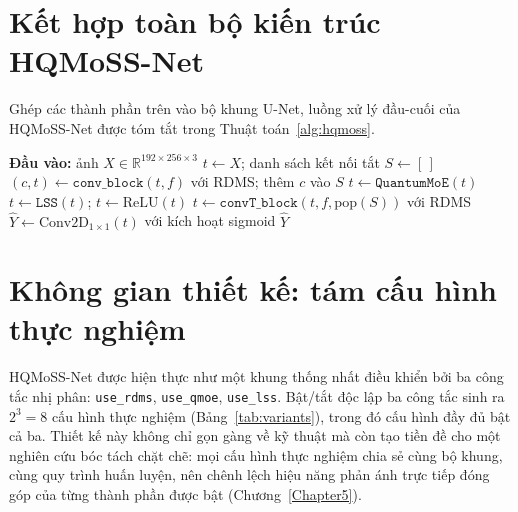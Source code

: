 \section{Kết hợp toàn bộ kiến trúc HQMoSS-Net}
Ghép các thành phần trên vào bộ khung U-Net, luồng xử lý đầu-cuối của HQMoSS-Net được tóm tắt trong Thuật toán~\ref{alg:hqmoss}.
\begin{algorithm}[h]
\caption{Luồng suy luận của HQMoSS-Net}
\label{alg:hqmoss}
\begin{algorithmic}[1]
\State \textbf{Đầu vào:} ảnh $X \in \mathbb{R}^{192\times 256\times 3}$
\State $t \gets X$; danh sách kết nối tắt $S \gets [\,]$
    \State $(c, t) \gets \texttt{conv\_block}(t, f)$ với RDMS; thêm $c$ vào $S$ 
\EndFor
\State $t \gets \texttt{QuantumMoE}(t)$ 
\State $t \gets \texttt{LSS}(t)$; $t\gets\mathrm{ReLU}(t)$ 
    \State $t \gets \texttt{convT\_block}(t, f, \text{pop}(S))$ với RDMS 
\EndFor
\State $\hat{Y} \gets \text{Conv2D}_{1\times 1}(t)$ với kích hoạt sigmoid
\State \Return $\hat{Y}$
\end{algorithmic}
\end{algorithm}

\section{Không gian thiết kế: tám cấu hình thực nghiệm}
\label{sec:variants}
HQMoSS-Net được hiện thực như một khung thống nhất điều khiển bởi ba công tắc nhị phân: \texttt{use\_rdms}, \texttt{use\_qmoe}, \texttt{use\_lss}. Bật/tắt độc lập ba công tắc sinh ra $2^3 = 8$ cấu hình thực nghiệm (Bảng~\ref{tab:variants}), trong đó cấu hình đầy đủ bật cả ba. Thiết kế này không chỉ gọn gàng về kỹ thuật mà còn tạo tiền đề cho một nghiên cứu bóc tách chặt chẽ: mọi cấu hình thực nghiệm chia sẻ cùng bộ khung, cùng quy trình huấn luyện, nên chênh lệch hiệu năng phản ánh trực tiếp đóng góp của từng thành phần được bật (Chương~\ref{Chapter5}).

